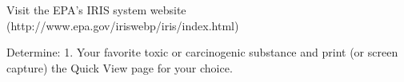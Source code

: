 \documentclass[11pt]{article}
\makeatletter
\newcommand{\boxspacing}{\kern\kvtcb@left@rule\kern\kvtcb@boxsep}
\newcommand{\prompt}[4]{
        {\ttfamily\llap{{\color{#2}[#3]:\hspace{3pt}#4}}\vspace{-\baselineskip}}
    }
\makeatother
\begin{document}
Visit the EPA's IRIS system website
(http://www.epa.gov/iriswebp/iris/index.html)

Determine: 1. Your favorite toxic or carcinogenic substance and print
(or screen capture) the Quick View page for your choice.

    \begin{tcolorbox}[breakable, size=fbox, boxrule=1pt, pad at break*=1mm,colback=cellbackground, colframe=cellborder]
\prompt{In}{incolor}{ }{\boxspacing}
\begin{Verbatim}[commandchars=\\\{\}]

\end{Verbatim}
\end{tcolorbox}


    
    
    
\end{document}
